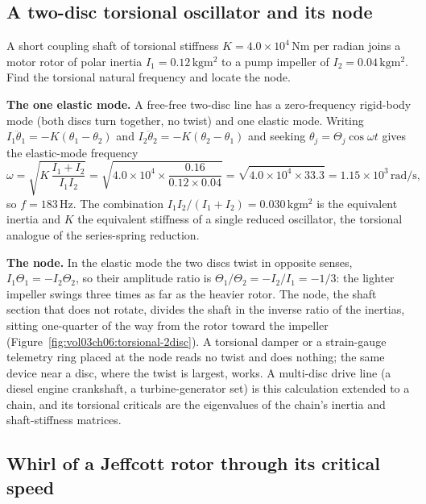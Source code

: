 \subsection{A two-disc torsional oscillator and its node}

A short coupling shaft of torsional stiffness $K = 4.0\times 10^4\,\si{
\newton\meter}$ per radian joins a motor rotor of polar inertia $I_1 =
0.12\,\si{\kilogram\meter\squared}$ to a pump impeller of $I_2 =
0.04\,\si{\kilogram\meter\squared}$. Find the torsional natural
frequency and locate the node.

\textbf{The one elastic mode.} A free-free two-disc line has a
zero-frequency rigid-body mode (both discs turn together, no twist) and
one elastic mode. Writing $I_1\ddot\theta_1 = -K(\theta_1 - \theta_2)$
and $I_2\ddot\theta_2 = -K(\theta_2 - \theta_1)$ and seeking
$\theta_j = \Theta_j\cos\omega t$ gives the elastic-mode frequency
\[
\omega = \sqrt{K\,\frac{I_1 + I_2}{I_1 I_2}} = \sqrt{4.0\times 10^4\times
\frac{0.16}{0.12\times 0.04}} = \sqrt{4.0\times 10^4\times 33.3} =
1.15\times 10^3\,\si{\radian\per\second},
\]
so $f = 183\,\si{\hertz}$. The combination $I_1 I_2/(I_1 + I_2) =
0.030\,\si{\kilogram\meter\squared}$ is the equivalent inertia and $K$
the equivalent stiffness of a single reduced oscillator, the torsional
analogue of the series-spring reduction.

\textbf{The node.} In the elastic mode the two discs twist in opposite
senses, $I_1\Theta_1 = -I_2\Theta_2$, so their amplitude ratio is
$\Theta_1/\Theta_2 = -I_2/I_1 = -1/3$: the lighter impeller swings three
times as far as the heavier rotor. The node, the shaft section that does
not rotate, divides the shaft in the inverse ratio of the inertias,
sitting one-quarter of the way from the rotor toward the impeller
(Figure~\ref{fig:vol03ch06:torsional-2disc}). A torsional damper or a
strain-gauge telemetry ring placed at the node reads no twist and does
nothing; the same device near a disc, where the twist is largest, works.
A multi-disc drive line (a diesel engine crankshaft, a
turbine-generator set) is this calculation extended to a chain, and its
torsional criticals are the eigenvalues of the chain's inertia and
shaft-stiffness matrices.



\subsection{Whirl of a Jeffcott rotor through its critical speed}


